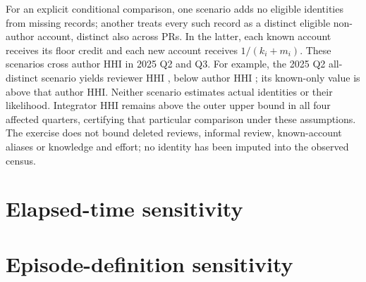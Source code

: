 \documentclass[11pt]{article}
\begin{document}
\begin{table}[htb]
\centering\small
\caption{Missing-identity sensitivity on fixed known-reviewed merged PRs.
\emph{Missing} counts eligible unattributed records; \emph{Reviewer} is the known-only
fractional-credit HHI. The range is a conservative outer bound. Author and
integrator HHIs use the same PR membership.}
\label{tab:identitybounds}
\end{table}

For an explicit conditional comparison, one scenario adds no eligible identities
from missing records; another treats every such record as a distinct eligible
non-author account, distinct also across PRs. In the latter, each known account
receives its floor credit and each new account receives $1/(k_i+m_i)$.
These scenarios cross author HHI in 2025 Q2 and Q3. For example, the 2025 Q2
all-distinct scenario yields reviewer HHI
\MissingIdentityQTwoDistinctScenario{}, below author HHI
\MissingIdentityQTwoAuthor{}; its known-only value is above that author HHI.
Neither scenario estimates actual identities or their likelihood. Integrator
HHI remains above the outer upper bound in all four affected quarters, certifying
that particular comparison under these assumptions. The exercise does not
bound deleted reviews, informal review, known-account aliases or knowledge and
effort; no identity has been imputed into the observed census.

\section{Elapsed-time sensitivity}
\begin{table}[htb]
\centering\small
\caption{Diagnostic elapsed-time associations for a 0.1 increase in prior
merger HHI (95\% intervals in parentheses). Every model uses role/experience
baseline strata, prior merge volume and calendar time. The late-period risk
set is conditional on remaining undisposed through day 30.}
\label{tab:agewindows}
\end{table}

\section{Episode-definition sensitivity}
\begin{table}[htb]
\centering\small
\caption{Alternative initial-episode definitions at the 90-day exposure window.
Constant and late-period estimates use their respective model specifications;
all hazard ratios concern a 0.1 increase in prior merger HHI. Intervals are
quarter-clustered and exploratory.}
\label{tab:episodechecks}
\end{table}



\end{document}
